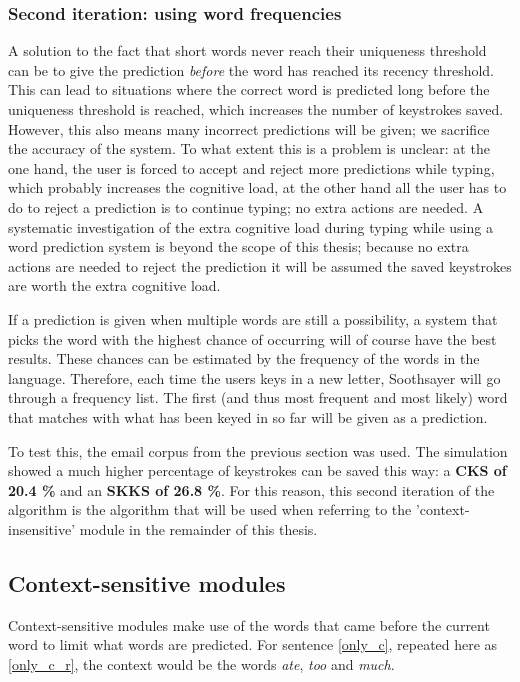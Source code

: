 \documentclass[11pt]{article}
\begin{document}
\subsubsection{Second iteration: using word frequencies}
A solution to the fact that short words never reach their uniqueness threshold can be to give the prediction \emph{before} the word has reached its recency threshold. This can lead to situations where the correct word is predicted long before the uniqueness threshold is reached, which increases the number of keystrokes saved. However, this also means many incorrect predictions will be given; we sacrifice the accuracy of the system. To what extent this is a problem is unclear: at the one hand, the user is forced to accept and reject more predictions while typing, which probably increases the cognitive load, at the other hand all the user has to do to reject a prediction is to continue typing; no extra actions are needed. A systematic investigation of the extra cognitive load during typing while using a word prediction system is beyond the scope of this thesis; because no extra actions are needed to reject the prediction it will be assumed the saved keystrokes are worth the extra cognitive load.

If a prediction is given when multiple words are still a possibility, a system that picks the word with the highest chance of occurring will of course have the best results. These chances can be estimated by the frequency of the words in the language. Therefore, each time the users keys in a new letter, Soothsayer will go through a frequency list. The first (and thus most frequent and most likely) word that matches with what has been keyed in so far will be given as a prediction.

To test this, the email corpus from the previous section was used. The simulation showed a much higher percentage of keystrokes can be saved this way: a \textbf{CKS of 20.4 \%} and an \textbf{SKKS of 26.8 \%}. For this reason, this second iteration of the algorithm is the algorithm that will be used when referring to the 'context-insensitive' module in the remainder of this thesis.

\subsection{Context-sensitive modules} \label{cs}

Context-sensitive modules make use of the words that came before the current word to limit what words are predicted. For sentence \ref{only_c}, repeated here as \ref{only_c_r}, the context would be the words \emph{ate}, \emph{too} and \emph{much}.
\end{document}
